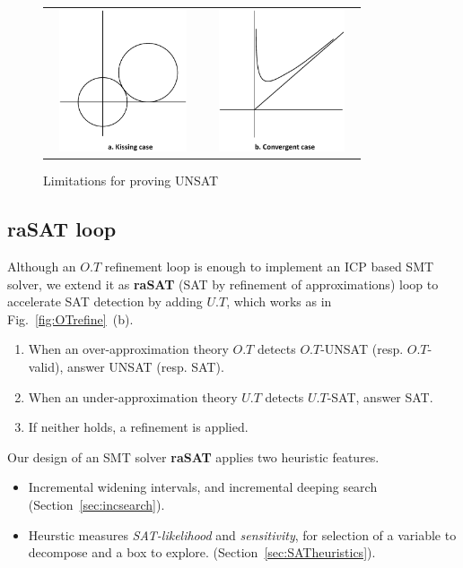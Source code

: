\documentclass[runningheads,a4paper,oribibl]{llncs}
\begin{document}
\begin{figure}[ht]
\centering
\begin{tabular}{cc}
\includegraphics[height=1.65in,width=1.7in]{kissing.eps} &
\includegraphics[height=1.65in,width=1.7in]{convergence.eps}
\end{tabular}
\caption{Limitations for proving UNSAT} 
\label{fig:limit} 
\end{figure} 



\subsection{raSAT loop}

Although an $O.T$ refinement loop is enough to implement an ICP based SMT solver, 
we extend it as {\bf raSAT} (SAT by refinement of approximations) loop to accelerate SAT detection 
by adding $U.T$, which works as in Fig.~\ref{fig:OTrefine}~(b). 
\begin{enumerate}
\item When an over-approximation theory $O.T$ detects $O.T$-UNSAT (resp. $O.T$-valid), 
answer UNSAT (resp. SAT). 
\item When an under-approximation theory $U.T$ detects $U.T$-SAT, answer SAT. 
\item If neither holds, a refinement is applied. 
\end{enumerate}

Our design of an SMT solver {\bf raSAT} applies two heuristic features. 
\begin{itemize}
\item Incremental widening intervals, and incremental deeping search 
(Section~\ref{sec:incsearch}). 
\item 
Heurstic measures {\em SAT-likelihood} and {\em sensitivity}, 
for selection of a variable to decompose and a box to explore. 
(Section~\ref{sec:SATheuristics}). 
\end{itemize} 
\end{document}
